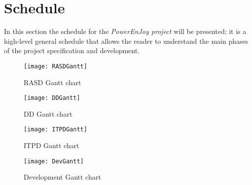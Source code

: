 \section{Schedule}\label{sec:schedule}
In this section the schedule for the \emph{PowerEnJoy project} will be presented; it is a high-level general schedule that allows the reader to understand the main phases of the project specification and development.

\begin{figure}[h]
	\centering
	\texttt{[image: RASDGantt]}	\caption{
		\label{fig:rasdGantt} 
		RASD Gantt chart
	}
\end{figure}

\begin{figure}[h]
	\centering
	\texttt{[image: DDGantt]}	\caption{
		\label{fig:ddGantt} 
		DD Gantt chart
	}
\end{figure}

\begin{figure}[h]
	\centering
	\texttt{[image: ITPDGantt]}	\caption{
		\label{fig:itpdGantt} 
		ITPD Gantt chart
	}
\end{figure}

\begin{figure}[h]
	\centering
	\texttt{[image: DevGantt]}	\caption{
		\label{fig:devGantt} 
		Development Gantt chart
	}
\end{figure}

\clearpage
